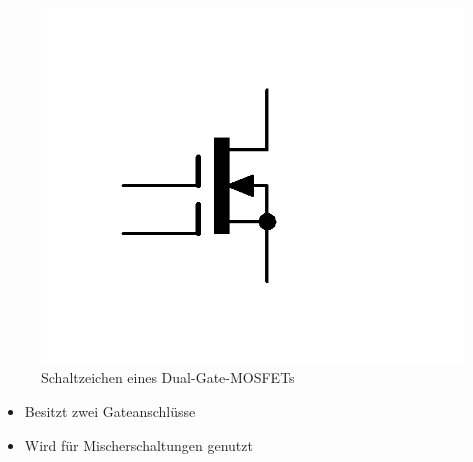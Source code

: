 \begin{frame}
  \begin{center}
    \begin{figure}
      \includegraphics[width=\textwidth,height=.6\textheight,keepaspectratio]{a06/Dual-Gate-MOSFET.png}
      \caption{Schaltzeichen eines Dual-Gate-MOSFETs}
    \end{figure}
  \end{center}
  \begin{itemize}
    \item Besitzt zwei Gateanschlüsse
    \item Wird für Mischerschaltungen genutzt
  \end{itemize}
\end{frame}

